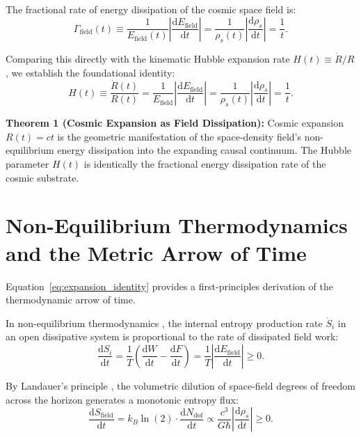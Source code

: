 \documentclass[aps,prd,reprint,superscriptaddress,nofootinbib,floatfix,amsmath,amssymb]{revtex4-2}
\begin{document}
The fractional rate of energy dissipation of the cosmic space field is:
\begin{equation}
\Gamma_{\text{field}}(t) \equiv \frac{1}{E_{\text{field}}(t)} \left| \frac{\mathrm{d}E_{\text{field}}}{\mathrm{d}t} \right| = \frac{1}{\rho_s(t)} \left| \frac{\mathrm{d}\rho_s}{\mathrm{d}t} \right| = \frac{1}{t}.
\label{eq:dissipation_rate}
\end{equation}

Comparing this directly with the kinematic Hubble expansion rate $H(t) \equiv \dot{R}/R$, we establish the foundational identity:
\begin{equation}
H(t) \equiv \frac{\dot{R}(t)}{R(t)} = \frac{1}{E_{\text{field}}} \left| \frac{\mathrm{d}E_{\text{field}}}{\mathrm{d}t} \right| = \frac{1}{\rho_s(t)} \left| \frac{\mathrm{d}\rho_s}{\mathrm{d}t} \right| = \frac{1}{t}.
\label{eq:expansion_identity}
\end{equation}

\textbf{Theorem 1 (Cosmic Expansion as Field Dissipation):} Cosmic expansion $R(t) = ct$ is the geometric manifestation of the space-density field's non-equilibrium energy dissipation into the expanding causal continuum. The Hubble parameter $H(t)$ is identically the fractional energy dissipation rate of the cosmic substrate.

\section{Non-Equilibrium Thermodynamics and the Metric Arrow of Time}
\label{sec:thermodynamics}

Equation~\eqref{eq:expansion_identity} provides a first-principles derivation of the thermodynamic arrow of time.

In non-equilibrium thermodynamics \cite{Prigogine1978,Jarzynski1997,Crooks1999}, the internal entropy production rate $\dot{S}_i$ in an open dissipative system is proportional to the rate of dissipated field work:
\begin{equation}
\frac{\mathrm{d}S_i}{\mathrm{d}t} = \frac{1}{T} \left( \frac{\mathrm{d}W}{\mathrm{d}t} - \frac{\mathrm{d}F}{\mathrm{d}t} \right) = \frac{1}{T} \left| \frac{\mathrm{d}E_{\text{field}}}{\mathrm{d}t} \right| \ge 0.
\label{eq:noneq_entropy}
\end{equation}

By Landauer's principle \cite{Landauer1961}, the volumetric dilution of space-field degrees of freedom across the horizon generates a monotonic entropy flux:
\begin{equation}
\frac{\mathrm{d}S_{\text{field}}}{\mathrm{d}t} = k_B \ln(2) \cdot \frac{\mathrm{d}N_{\text{dof}}}{\mathrm{d}t} \propto \frac{c^3}{G \hbar} \left| \frac{\mathrm{d}\rho_s}{\mathrm{d}t} \right| \ge 0.
\label{eq:field_entropy}
\end{equation}
\end{document}
